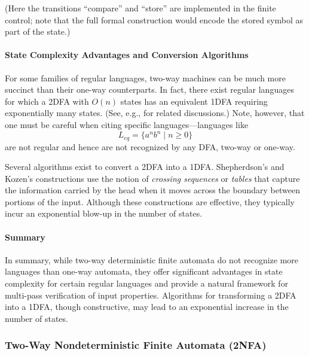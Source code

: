 (Here the transitions “compare” and “store” are implemented in the finite control; note that the full formal construction would encode the stored symbol as part of the state.)

\paragraph{State Complexity Advantages and Conversion Algorithms}
For some families of regular languages, two-way machines can be much more succinct than their one-way counterparts. In fact, there exist regular languages for which a 2DFA with \(O(n)\) states has an equivalent 1DFA requiring exponentially many states. (See, e.g., \cite{yakaryilmaz2010succinctness} for related discussions.) Note, however, that one must be careful when citing specific languages—languages like 
\[
L_{eq} = \{a^n b^n \mid n\ge0\}
\]
are not regular and hence are not recognized by any DFA, two-way or one-way.

Several algorithms exist to convert a 2DFA into a 1DFA. Shepherdson's and Kozen's constructions use the notion of \emph{crossing sequences} or \emph{tables} that capture the information carried by the head when it moves across the boundary between portions of the input. Although these constructions are effective, they typically incur an exponential blow-up in the number of states.

\paragraph{Summary}
In summary, while two-way deterministic finite automata do not recognize more languages than one-way automata, they offer significant advantages in state complexity for certain regular languages and provide a natural framework for multi-pass verification of input properties. Algorithms for transforming a 2DFA into a 1DFA, though constructive, may lead to an exponential increase in the number of states.


\subsubsection{Two-Way Nondeterministic Finite Automata (2NFA)}
\label{subsubsec:2nfa}

